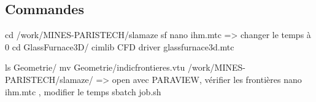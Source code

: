 \documentclass[12pt, a4paper, french, BCOR = 0pt, DIV = 10]{scrartcl}
\begin{document}
    \begin{appendices}
    \section{Commandes}
    cd /work/MINES-PARISTECH/slamaze
    sf
    nano ihm.mtc => changer le temps à 0
    cd GlassFurnace3D/
    cimlib CFD driver glassfurnace3d.mtc
    
    ls Geometrie/
    mv Geometrie/indicfrontieres.vtu /work/MINES-PARISTECH/slamaze/ => open avec PARAVIEW, vérifier les frontières
    nano ihm.mtc , modifier le temps
    sbatch job.sh
    \end{appendices}
\end{document}
